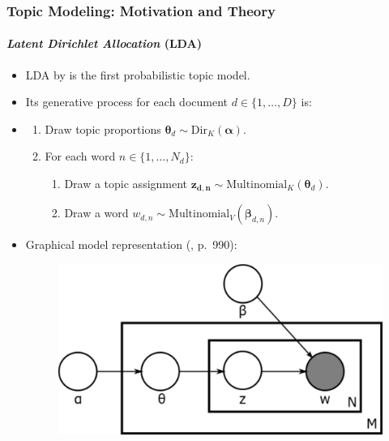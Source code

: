 \documentclass[xcolor=dvipsnames]{beamer}
\begin{document}
\begin{frame}
\frametitle{Topic Modeling: Motivation and Theory}
\framesubtitle{\textit{Latent Dirichlet Allocation} (LDA)}
\begin{itemize}
\item LDA by \textcite{blei2003latent} is the first probabilistic topic model.
\item Its generative process for each document $d \in \{1,\dots,D\}$ is:
\item[] 
	\begin{enumerate}[{1)}]
	\item Draw topic proportions $\boldsymbol{\theta}_d \sim \text{Dir}_K(\boldsymbol{\alpha})$.
	\item For each word $n \in \{1,\dots,N_d\}$:
		\begin{enumerate}[{a)}]
		\item Draw a topic assignment $\boldsymbol{z_{d,n}} \sim \text{Multinomial}_K(\boldsymbol{\theta}_d)$.
		\item Draw a word $w_{d,n} \sim \text{Multinomial}_V(\boldsymbol{\beta}_{d,n})$.
	\end{enumerate}
\end{enumerate}
\item Graphical model representation (\textcite{roberts2016model}, p.\ 990): 
	\begin{figure}[h!]
  	\centering
  	\hspace*{-1cm}\includegraphics[scale = 0.3]{../plots/presentation/lda_graphical.pdf}
	\end{figure}
\end{itemize}
\end{frame}
\end{document}
